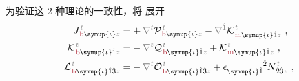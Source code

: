 为验证这 2 种理论的一致性，将  展开
\begin{subequations} \label{eq:JKL}
	\abovedisplayskip=7pt
	\belowdisplayskip=8pt
\begin{align}
	{J}^{\;\!\mathcolor{gray}{t}}_{\;\!\textcolor{Maroon}{\text{b}} \symup{\iota} \mathcolor{gray}{z}} &=+\hspace{0.2em} \mathcolor{gray}{\nabla^t} {\mathcal{P}}^{\;\!\mathcolor{gray}{t}}_{\;\!\textcolor{Maroon}{\text{b}} \symup{\iota} \mathcolor{gray}{z}} - \mathcolor{gray}{\nabla^{\hat{1}}} {\mathcal{K}}^{\;\!\mathcolor{gray}{t}}_{\;\!\textcolor{Maroon}{\text{m}} \symup{\iota} \mathcolor{gray}{\hat{1}} \mathcolor{gray}{z}}~, \label{eq:Jb} \\
	{\mathcal{K}}^{\;\!\mathcolor{gray}{t}}_{\;\!\textcolor{Maroon}{\text{b}} \symup{\iota}\hat{1} \mathcolor{gray}{z}} &= -\hspace{0.2em} \mathcolor{gray}{\nabla^t} {\mathcal{Q}}^{\;\!\mathcolor{gray}{t}}_{\;\!\textcolor{Maroon}{\text{b}} \symup{\iota}\hat{1} \mathcolor{gray}{z}} + {\mathcal{K}}^{\;\!\mathcolor{gray}{t}}_{\;\!\textcolor{Maroon}{\text{m}} \symup{\iota}\hat{1} \mathcolor{gray}{z}}~, \label{eq:Kb} \\
	{\mathcal{L}}^{\;\!\mathcolor{gray}{t}}_{\;\!\textcolor{Maroon}{\text{b}} \symup{\iota}\hat{1}\hat{3} \mathcolor{gray}{z}} &= -\hspace{0.2em} \mathcolor{gray}{\nabla^t} {\mathcal{O}}^{\;\!\mathcolor{gray}{t}}_{\;\!\textcolor{Maroon}{\text{b}} \symup{\iota}\hat{1}\hat{3} \mathcolor{gray}{z}} + \epsilon^{\hphantom{\symup{\iota}\hat{1}}\hat{2}}_{\symup{\iota} \hat{1}} N^{\;\!\mathcolor{gray}{t}}_{\;\! \hat{2}\hat{3} \mathcolor{gray}{z}}~, \label{eq:Lb}
\end{align}
\end{subequations}
